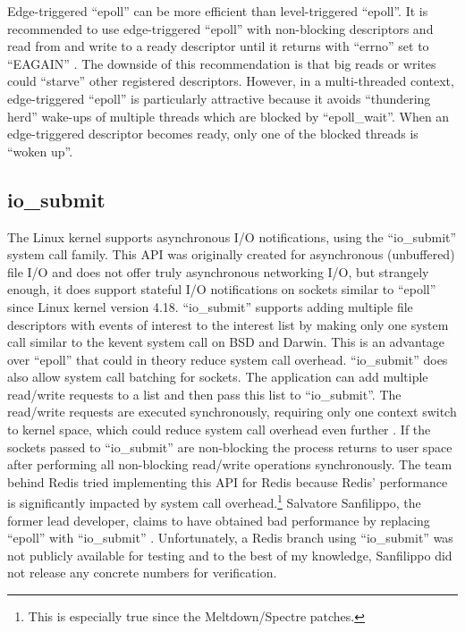 Edge-triggered “epoll” can be more efficient than level-triggered “epoll”. It is recommended  to use edge-triggered “epoll” with non-blocking descriptors and read from and write to a ready descriptor until it returns with “errno” set to “EAGAIN” \cite{man:epoll}. The downside of this recommendation is that big reads or writes could “starve” other registered descriptors.
However, in a multi-threaded context, edge-triggered “epoll” is particularly attractive because it avoids “thundering herd” wake-ups of multiple threads which are blocked by “epoll\_wait”. When an edge-triggered descriptor becomes ready, only one of the blocked threads is “woken up”.

\subsection{io\_submit}
The Linux kernel supports asynchronous I/O notifications, using the “io\_submit” system call family. This API was originally created for asynchronous (unbuffered) file I/O and does not offer truly asynchronous networking I/O, but strangely enough, it does support stateful I/O notifications on sockets similar to “epoll” since Linux kernel version 4.18. “io\_submit” supports adding multiple file descriptors with events of interest to the interest list by making only one system call similar to the kevent system call on BSD and Darwin. This is an advantage over “epoll” that could in theory reduce system call overhead. \newline
“io\_submit” does also allow system call batching for sockets. The application can add multiple read/write requests to a list and then pass this list to “io\_submit”. The read/write requests are executed synchronously, requiring only one context switch to kernel space, which could reduce system call overhead even further  \cite{man:io_submit, majkowski:io_submit}. If the sockets passed to “io\_submit” are non-blocking the process returns to user space after performing all non-blocking read/write operations synchronously.
The team behind Redis tried implementing this API for Redis because Redis’ performance is significantly impacted by system call overhead.\footnote{This is especially true since the Meltdown/Spectre patches.} Salvatore Sanfilippo, the former lead developer, claims to have obtained bad performance by replacing “epoll” with “io\_submit” \cite{antirez:io_submit2}. Unfortunately, a Redis branch using “io\_submit” was not publicly available for testing and to the best of my knowledge, Sanfilippo did not release any concrete numbers for verification.

